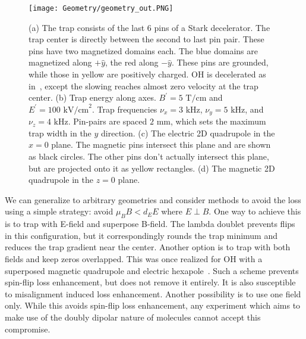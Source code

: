 \documentclass[%
 reprint,
groupedaddress,
 amsmath,amssymb,
 aps,
prl,
]{revtex4-1}
\newcommand{\epb}{{$E\!\perp\!B$}}
\begin{document}



\begin{figure}[tb]
\texttt{[image: Geometry/geometry\_out.PNG]}%
\caption{
(a) The trap consists of the last 6 pins of a Stark decelerator. The trap center is directly between the second to last pin pair. These pins have two magnetized domains each. The blue domains are magnetized along $+\hat{y}$, the red along $-\hat{y}$. These pins are grounded, while those in yellow are positively charged. OH is decelerated as in~\cite{Sawyer2008}, except the slowing reaches almost zero velocity at the trap center. (b) Trap energy along axes. $B^\prime=5\text{ T/cm}$ and $E^\prime=100 \text{ kV/cm}^2$. Trap frequencies $\nu_x=3\text{ kHz}$, $\nu_y=5\text{ kHz}$, and $\nu_z=4\text{ kHz}$. Pin-pairs are spaced $2\text{ mm}$, which sets the maximum trap width in the $y$ direction. (c) The electric 2D quadrupole in the $x=0$ plane. The magnetic pins intersect this plane and are shown as black circles. The other pins don't actually intersect this plane, but are projected onto it as yellow rectangles. (d) The magnetic 2D quadrupole in the $z=0$ plane.
\label{fig:CAD}}
\end{figure}

We can generalize to arbitrary geometries and consider methods to avoid the loss using a simple strategy: avoid $\mu_BB < d_EE$ where \epb. One way to achieve this is to trap with E-field and superpose B-field. The lambda doublet prevents flips in this configuration, but it correspondingly rounds the trap minimum and reduces the trap gradient near the center. Another option is to trap with both fields and keep zeros overlapped. This was once realized for OH with a superposed magnetic quadrupole and electric hexapole~\cite{Sawyer2007}. Such a scheme prevents spin-flip loss enhancement, but does not remove it entirely. It is also susceptible to misalignment induced loss enhancement. Another possibility is to use one field only. While this avoids spin-flip loss enhancement, any experiment which aims to make use of the doubly dipolar nature of molecules cannot accept this compromise.
\end{document}

